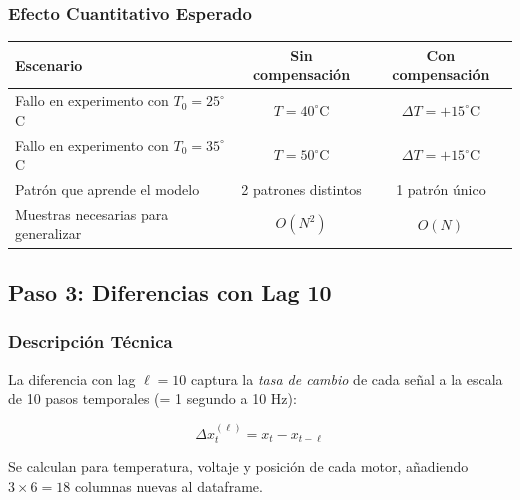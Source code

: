 \documentclass[12pt,a4paper]{article}
\begin{document}
\subsubsection{Efecto Cuantitativo Esperado}

\begin{center}
\begin{tabular}{lcc}
\toprule
\textbf{Escenario} & \textbf{Sin compensaci\'{o}n} & \textbf{Con compensaci\'{o}n} \\
\midrule
Fallo en experimento con $T_0=25^\circ$C & $T=40^\circ$C & $\Delta T=+15^\circ$C \\
Fallo en experimento con $T_0=35^\circ$C & $T=50^\circ$C & $\Delta T=+15^\circ$C \\
Patr\'{o}n que aprende el modelo & 2 patrones distintos & 1 patr\'{o}n \'{u}nico \\
Muestras necesarias para generalizar & $O(N^2)$ & $O(N)$ \\
\bottomrule
\end{tabular}
\end{center}

\subsection{Paso 3: Diferencias con Lag 10}

\subsubsection{Descripci\'{o}n T\'{e}cnica}

La diferencia con lag $\ell = 10$ captura la \textit{tasa de cambio} de cada se\~{n}al
a la escala de 10 pasos temporales (= 1 segundo a 10 Hz):

\begin{equation}
  \Delta x_t^{(\ell)} = x_t - x_{t-\ell}
\end{equation}

Se calculan para temperatura, voltaje y posici\'{o}n de cada motor, a\~{n}adiendo
$3 \times 6 = 18$ columnas nuevas al dataframe.
\end{document}
